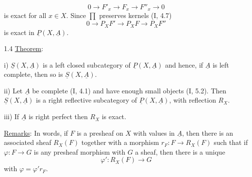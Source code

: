 \[
0\longrightarrow F'_x\longrightarrow F_x\longrightarrow F''_x\longrightarrow0
\]
is exact for all $x\in X$. Since $\prod$ preserves kernels (I, 4.7)
\[
0\longrightarrow P_XF'\longrightarrow P_XF\longrightarrow P_XF''
\]
is exact in $\underline{P}(X,\underline{A})$.

1.4 \uline{Theorem}:

i) $\underline{S}(X,\underline{A})$ is a left closed subcategory of $\underline{P}(X,\underline{A})$ and hence, if $\underline{A}$ is left complete, then so is $\underline{S}(X,\underline{A})$.

ii) Let $\underline{A}$ be complete (I, 4.1) and have enough small objects (I, 5.2). Then $\underline{S}(X,\underline{A})$ is a right reflective subcategory of $\underline{P}(X,\underline{A})$, with reflection $R_X$.

iii) If $\underline{A}$ is right perfect then $R_X$ is exact.

\uline{Remarks}: In  words, if $F$ is a presheaf on $X$ with values in $\underline{A}$, then there is an associated sheaf $R_X(F)$ together with a morphism $r_F:F\longrightarrow R_X(F)$ such that if $\varphi:F\longrightarrow G$ is any presheaf morphism with $G$ a sheaf, then there is a unique
\[
\varphi':R_X(F)\longrightarrow G
\]
with $\varphi=\varphi'r_F$.

